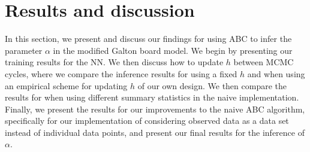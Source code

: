 \documentclass[11pt,a4paper]{article}
\begin{document}












    
    
    
    




\section{Results and discussion}

In this section, we present and discuss our findings for using ABC to infer the parameter $\alpha$ in the modified Galton board model. We begin by presenting our training results for the NN. We then discuss how to update $h$ between MCMC cycles, where we compare the inference results for using a fixed $h$ and when using an empirical scheme for updating $h$ of our own design. We then compare the results for when using different summary statistics in the naive implementation. Finally, we present the results for our improvements to the naive ABC algorithm, specifically for our implementation of considering observed data as a data set instead of individual data points, and present our final results for the inference of $\alpha$.
\end{document}
